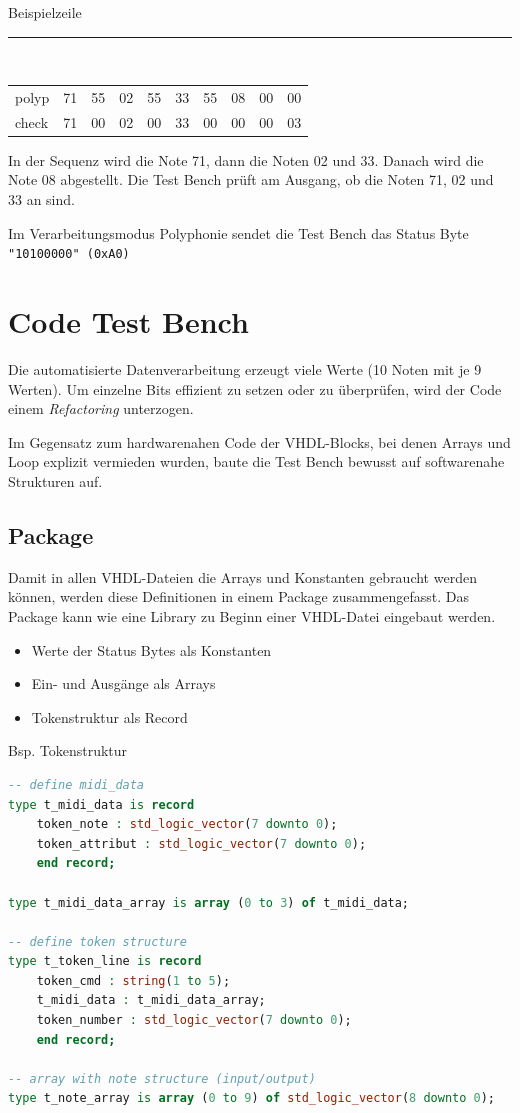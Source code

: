 Beispielzeile\\
\rule{\textwidth}{0.4pt}\\
{
\renewcommand{\arraystretch}{1.0} %
\begin{tabular*}{\textwidth}{@{}@{\extracolsep{\fill}}*{10}{l}@{}} %
polyp & 71 & 55 & 02 & 55 & 33 & 55 & 08 & 00 & 00\\
check & 71 & 00 & 02 & 00 & 33 & 00 & 00 & 00 & 03
\end{tabular*}
}

In der Sequenz wird die Note 71, dann die Noten 02 und 33. Danach wird die Note 08 abgestellt. Die Test Bench prüft am Ausgang, ob die Noten 71, 02 und 33 an sind. 

Im Verarbeitungsmodus Polyphonie sendet die Test Bench  das Status Byte \lstinline|"10100000" (0xA0)|

\section{Code Test Bench}\label{sec.code_testbench}

Die automatisierte Datenverarbeitung erzeugt viele Werte (10 Noten mit je 9 Werten). Um einzelne Bits effizient zu setzen oder zu überprüfen, wird der Code einem \textit{Refactoring} unterzogen.

Im Gegensatz zum hardwarenahen Code der VHDL-Blocks, bei denen Arrays und Loop explizit vermieden wurden, baute die Test Bench bewusst auf softwarenahe Strukturen auf.

\subsection{Package}

Damit in allen VHDL-Dateien die Arrays und Konstanten gebraucht werden können, werden diese Definitionen in einem Package zusammengefasst. Das Package kann wie eine Library zu Beginn einer VHDL-Datei eingebaut werden.
\begin{itemize}
	\item Werte der Status Bytes als Konstanten
	\item Ein- und Ausgänge als Arrays
	\item Tokenstruktur als Record
\end{itemize}

Bsp. Tokenstruktur

\begin{lstlisting}[language=vhdl]
-- define midi_data
type t_midi_data is record
    token_note : std_logic_vector(7 downto 0);
    token_attribut : std_logic_vector(7 downto 0);
    end record;

type t_midi_data_array is array (0 to 3) of t_midi_data;

-- define token structure
type t_token_line is record
    token_cmd : string(1 to 5);
    t_midi_data : t_midi_data_array;
    token_number : std_logic_vector(7 downto 0);
    end record;

-- array with note structure (input/output)
type t_note_array is array (0 to 9) of std_logic_vector(8 downto 0);
\end{lstlisting}

